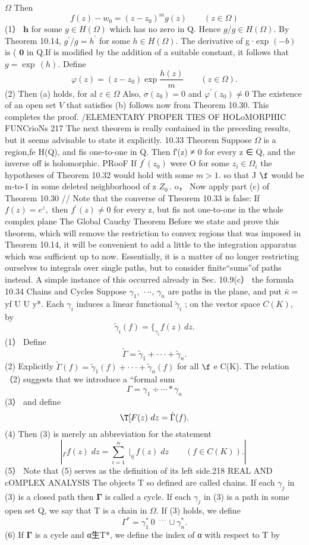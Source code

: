 $\Omega$ Then $$ f(z)-w_{0}=(z-z_{0})^{m}g(z)\qquad(z\in\Omega) $$ (1） ${\boldsymbol{h}}$ for some $g\in H(\Omega)$ which has no zero in Q. Hence $g/g\in H(\Omega).$ By Theorem 10.14, $g^{\prime}/g=h^{\prime}$ for some $h\in H(\Omega).$ The derivative of g·exp $\scriptstyle(-b)$ is ( $\mathbf{0}$ in Q.If is modified by the addition of a suitable constant, it follows that $g=\exp\,(h).$ Define $$ \varphi(z)=(z-z_{0})\exp{\frac{h(z)}{m}}\qquad(z\in\Omega). $$ (2) Then (a) holds, for al $\varepsilon\in\Omega$ Also, $\sigma(z_{0})=0$ and $\varphi^{\prime}(z_{0})\neq0$ The existence of an open set ${\mathbf{}}V$ that satisfies (b) follows now from Theorem 10.30. This completes the proof. /ELEMENTARY PROPER TIES OF HOLoMORPHIC FUNCrioNs 217 The next theorem is really contained in the preceding results, but it seems advisable to state it explicitly. 10.33 Theorem Suppose $\Omega$ is a region,fe H(Q), and fis one-to-one in Q. Then f′(z) ≠ 0 for every z ∈ Q, and the inverse off is holomorphic. PRooF If $f^{\prime}(z_{0})$ were O for some $z_{i}\in\Omega_{i}$ the hypotheses of Theorem 10.32 would hold with some $m>1.$ so that J $\boldsymbol{\f}$ would be m-to-1 in some deleted neighborhood of z $Z_{0}\,.$ o， Now apply part (c) of Theorem 10.30 // Note that the converse of Theorem 10.33 is false: If $f(z)=e^{z},$ then $f^{\prime}(z)\neq0$ for every z, but fis not one-to-one in the whole complex plane The Global Cauchy Theorem Before we state and prove this theorem, which will remove the restriction to convex regions that was imposed in Theorem 10.14, it will be convenient to add a little to the integration apparatus which was sufficient up to now. Essentially, it is a matter of no longer restricting ourselves to integrals over single paths, but to consider finite“sums”of paths instead. A simple instance of this occurred already in Sec. 10.9(c） the formula 10.34 Chains and Cycles Suppose $\gamma_{1},\,\cdot\cdot\cdot,\,\gamma_{n}$ are paths in the plane, and put $\scriptstyle{\bar{\kappa}}=$ yf U U y*. Each $\gamma_{i}$ induces a linear functional ${\tilde{\gamma}}_{i}$ ; on the vector space $C(K),$ by $$ \tilde{\gamma}_{i}(f)= \{_{\gamma_{i}}^{}f(z)\,d z. $$ (1） Define $$ \widetilde\Gamma=\widetilde\gamma_{1}+\cdot\cdot\cdot+\widetilde\gamma_{n}. $$ (2) Explicitly $\tilde{\Gamma}(f)=\tilde{\gamma}_{1}(f)+\cdot\cdot\cdot+\tilde{\gamma}_{n}(f)$ for all $\boldsymbol{\f}$ e C(K). The relation （2) suggests that we introduce a “formal sum $$ \Gamma=\gamma_{1}\div\cdots*\gamma_{n} $$ (3） and define $$ \T[F(z)~d z=\hat{\Gamma}(f). $$ (4) Then (3) is merely an abbreviation for the statement $$ \left\vert_{\Gamma}f(z)\;d z=\sum_{i=1}^{n}\; \vert_{\eta^{\prime}}f(z)\;d z\qquad(f\in C(K)).\right\vert\; $$ (5） Note that (5) serves as the definition of its left side.218 REAL AND cOMPLEX ANALYSIS The objects T so defined are called chains. If each $\gamma_{j}$ in (3) is a closed path then $\boldsymbol{\Gamma}$ is called a cycle. If each $\gamma_{j}$ in (3) is a path in some open set Q, we say that T is a chain in $\Omega.$ If (3) holds, we define $$ \Gamma^{*}=\gamma_{1}^{*}\ 0\ ^{\mathrm{~}\cdot\cdot\cdot}\cup\gamma_{n}^{*}. $$ (6) If ${\boldsymbol{\Gamma}}$ is a cycle and α生T*, we define the index of α with respect to T by $$ 